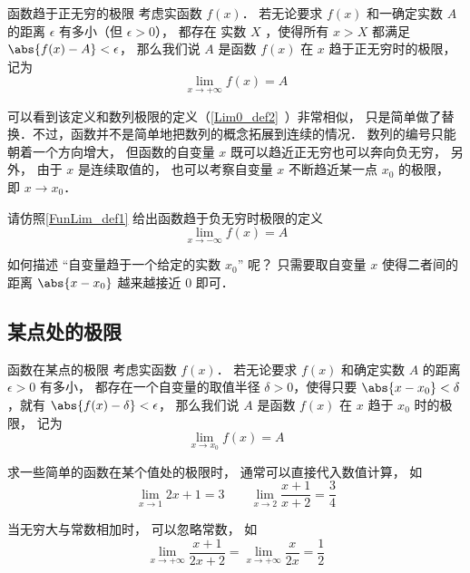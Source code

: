 \begin{definition}{函数趋于正无穷的极限}\label{FunLim_def1}
考虑实函数 $f(x)$． 若无论要求 $f(x)$ 和一确定实数 $A$ 的距离 $\epsilon$ 有多小（但 $\epsilon>0$）， 都存在 实数 $X$ ，使得所有 $x>X$ 都满足 $\abs{f(x)-A}<\epsilon$， 那么我们说 $A$ 是函数 $f(x)$ 在 $x$ 趋于正无穷时的极限， 记为
\begin{equation}
\lim\limits_{x\to +\infty} f(x) = A
\end{equation}
\end{definition}

可以看到该定义和数列极限的定义（\autoref{Lim0_def2}~）非常相似， 只是简单做了替换．不过，函数并不是简单地把数列的概念拓展到连续的情况． 数列的编号只能朝着一个方向增大， 但函数的自变量 $x$ 既可以趋近正无穷也可以奔向负无穷， 另外， 由于 $x$ 是连续取值的， 也可以考察自变量 $x$ 不断趋近某一点 $x_0$ 的极限， 即 $x\to x_0$．


\begin{exercise}{}
请仿照\autoref{FunLim_def1} 给出函数趋于负无穷时极限的定义
\begin{equation}
\lim\limits_{x\to -\infty} f(x) = A
\end{equation}
\end{exercise}

如何描述 “自变量趋于一个给定的实数 $x_0$” 呢？ 只需要取自变量 $x$ 使得二者间的距离 $\abs{x-x_0}$ 越来越接近 $0$ 即可．

\subsection{某点处的极限}
\begin{definition}{函数在某点的极限}\label{FunLim_def3}
考虑实函数 $f(x)$． 若无论要求 $f(x)$ 和确定实数 $A$ 的距离 $\epsilon>0$ 有多小， 都存在一个自变量的取值半径 $\delta>0$，使得只要 $\abs{x-x_0} < \delta$，就有 $\abs{f(x)-\delta}<\epsilon$，
那么我们说 $A$ 是函数 $f(x)$ 在 $x$ 趋于 $x_0$ 时的极限， 记为
\begin{equation}
\lim\limits_{x\to x_0}f(x)=A
\end{equation}
\end{definition}


\begin{example}{}
求一些简单的函数在某个值处的极限时， 通常可以直接代入数值计算， 如
\begin{equation}
\lim_{x\to 1} 2x + 1 = 3 \qquad \lim_{x\to 2}\frac{x + 1}{x + 2} = \frac34
\end{equation}

当无穷大与常数相加时， 可以忽略常数， 如
\begin{equation}
\lim_{x\to +\infty} \frac{x + 1}{2x + 2} = \lim_{x\to +\infty} \frac{x}{2x} = \frac12
\end{equation}
\end{example}


